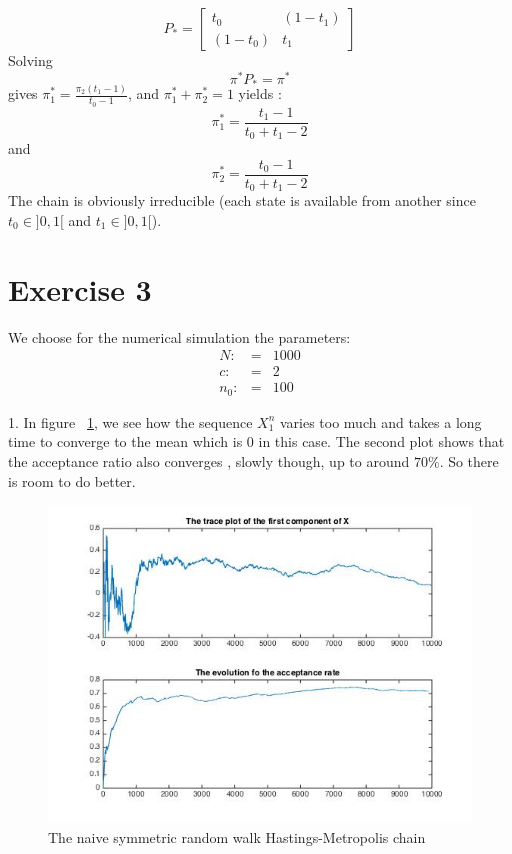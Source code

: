 	$$P_{*}= \begin{bmatrix} t_0 & (1-t_1) \\ (1-t_0) & t_1 \end{bmatrix}$$
	Solving 
	$$ \pi^{*} P_{*} = \pi^{*} $$ 
	gives $\pi^{*}_1=\frac{\pi_2(t_1-1)}{t_0-1}$, and $\pi^{*}_1 + \pi^{*}_2 = 1 $ yields :
	$$\boxed{\pi^{*}_1 = \frac{t_1-1}{t_0+t_1 -2}}$$
	and
	$$\boxed{\pi^{*}_2 = \frac{t_0-1}{t_0+t_1-2}}$$
	The chain is obviously irreducible (each state is available from another since $t_0 \in ]0,1[$  and $t_1 \in ]0,1[$).
	
	\section*{Exercise 3}
	We choose for the numerical simulation the parameters:
	\begin{eqnarray*}
		N :&=&1000\\
		c :&=&2\\
		n_0 :&=&100
	\end{eqnarray*}
	
	1.  In figure ~\ref{nrwHM}, we see how the sequence $X^n_1$ varies too much and takes a long time to converge to the mean which is $0$ in this case. The second plot shows that the acceptance ratio also converges , slowly though, up to around $70\%$. So there is room to do better.
	\begin{figure}[H]
		\centering
		\includegraphics[scale=.5]{figures/nrwHM}
		\caption{The naive symmetric random walk Hastings-Metropolis chain}
		\label{nrwHM}
	\end{figure}
	~\\
	
